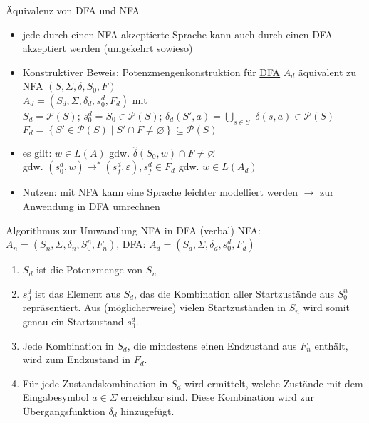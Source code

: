 \begin{frame}{Äquivalenz von DFA und NFA}
	\begin{itemize}
		\item jede durch einen NFA akzeptierte Sprache kann auch durch einen DFA akzeptiert werden (umgekehrt sowieso)
		\item Konstruktiver Beweis: Potenzmengenkonstruktion für \underline{DFA} $A_d$ äquivalent zu NFA $(S, \Sigma, \delta, S_0, F)$\\
		$A_d=\left(S_d, \Sigma, \delta_d, s_0^d, F_d\right)$ mit\\
		\quad $S_d=\mathcal{P}(S)$; 
		\quad $s_0^d=S_0 \in \mathcal{P}(S)$;
		\quad $\delta_d(S', a)=\bigcup_{s \in S}$
		\quad $\delta(s, a) \in \mathcal{P}(S)$\\
		\quad $F_d = \left\{S' \in \mathcal{P}(S) \mid S' \cap F \neq \varnothing\right\} \subseteq \mathcal{P}(S)$
		\item es gilt: $w \in L(A)$ gdw. $\hat{\delta}(S_0, w) \cap F \neq \varnothing$\\
		\quad gdw. $(s_0^d, w) \mapsto^* (s_f^d, \varepsilon), s_f^d \in F_d$ gdw. $w \in L(A_d)$
		\item Nutzen: mit NFA kann eine Sprache leichter modelliert werden $\rightarrow$ zur Anwendung in DFA umrechnen
	\end{itemize}
\end{frame}

\begin{frame}{Algorithmus zur Umwandlung NFA in DFA (verbal)}
	NFA: $A_n=(S_n, \Sigma, \delta_n, S_0^n, F_n)$, DFA: $A_d=(S_d, \Sigma, \delta_d, s_0^d, F_d)$
	\begin{enumerate}
		\item $S_d$ ist die Potenzmenge von $S_n$
		\item $s_0^d$ ist das Element aus $S_d$, das die Kombination aller Startzustände aus $S_0^n$ repräsentiert. Aus (möglicherweise) vielen Startzuständen in $S_n$ wird somit genau ein Startzustand $s_0^d$.
		\item Jede Kombination in $S_d$, die mindestens einen Endzustand aus $F_n$ enthält, wird zum Endzustand in $F_d$.
		\item Für jede Zustandskombination in $S_d$ wird ermittelt, welche Zustände mit dem Eingabesymbol $a \in \Sigma$ erreichbar sind. Diese Kombination wird zur Übergangsfunktion $\delta_d$ hinzugefügt.
	\end{enumerate}
\end{frame}

